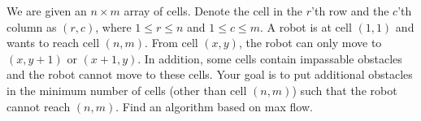 \problem{}
We are given an $n \times m$ array of cells. Denote the cell in the $r$'th row and the $c$'th column as $(r,c)$, where $1 \leq r \leq n$ and $1 \leq c \leq m$. A robot is at cell $(1, 1)$ and wants to reach cell $(n, m)$. From cell $(x, y)$, the robot can only move to $(x,y+1)$ or $(x+1,y)$. In addition, some cells contain impassable obstacles and the robot cannot move to these cells. Your goal is to put additional obstacles in the minimum number of cells (other than cell $(n, m)$) such that the robot cannot reach $(n, m)$.  Find an algorithm based on max flow.  

\solution{}

\newpage